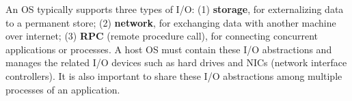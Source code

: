 \label{sec:abi:streams}



An OS typically supports three types of I/O:
(1) {\bf storage}, for externalizing data to a permanent store;
(2) {\bf network}, for exchanging data with another machine over internet;
(3) {\bf RPC} (remote procedure call),
for connecting concurrent applications or processes.
A host OS must contain these I/O abstractions
and manages the related I/O devices such as hard drives and NICs (network interface controllers).
It is also important to share these I/O abstractions
among multiple processes of an application.









